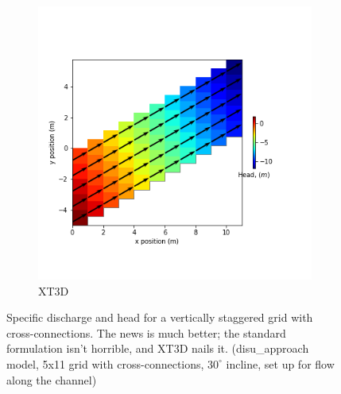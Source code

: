 \documentclass{article}
\begin{document}
\begin{figure}[H]
\begin{subfigure}{0.4\textwidth}
	\includegraphics[width=\textwidth]{../figures/disu-x-cc-head.png}
	\caption{XT3D}
	\label{fig:disu-x-cc-head}
\end{subfigure}
\caption{Specific discharge and head for a vertically staggered grid with cross-connections. The news is much better; the standard formulation isn't horrible, and XT3D nails it. (disu\_approach model, 5x11 grid with cross-connections, $30^{\circ}$ incline, set up for flow along the channel)}
\label{fig:figures}
\end{figure}
\end{document}
